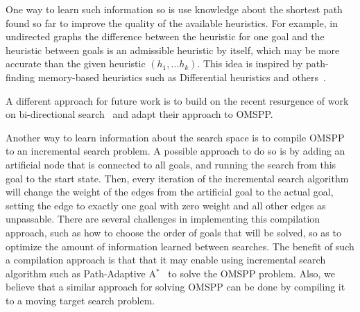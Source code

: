 \documentclass[smallextended]{svjour3}       %
\newcommand{\omspp}{\ac{OMSPP}\xspace}
\newcommand{\astar}{A$^*$\xspace}
\newcommand{\roni}[1]{\textbf{[RS:#1]}}
\begin{document}
One way to learn such information so is use knowledge about the shortest path found so far to improve the quality of the available heuristics.
For example, in undirected graphs the difference between the heuristic for one goal and the heuristic between goals is an admissible heuristic by itself, which may be more accurate than the given heuristic $(h_1, \ldots h_k)$.
This idea is inspired by path-finding memory-based heuristics such as Differential heuristics and others~\cite{sturtevant2007memory,SturtevantFBSN2009,goldenberg2011theCompressed}.


A different approach for future work is to build on the recent resurgence of work on bi-directional search~\cite{MMAAAI16,sturtevant2018aBrief,shaham2018minimizing} and adapt their approach to \omspp. 

Another way to learn information about the search space is to compile \omspp to an incremental search problem.
A possible approach to do so is by adding an artificial node that is connected to all goals, and running the search from this goal to the start state.
Then, every iteration of the incremental search algorithm will change the weight of the edges from the artificial goal to the actual goal, setting the edge to exactly one goal with zero weight and all other edges as unpassable.
There are several challenges in implementing this compilation approach, such as how to choose the order of goals that will be solved, so as to optimize the amount of information learned between searches.
The benefit of such a compilation approach is that that it may enable using incremental search algorithm such as Path-Adaptive \astar~\cite{hernandez2015reusing} to solve the \omspp problem.
Also, we believe that a similar approach for solving \omspp can be done by compiling it to a moving target search problem.




\end{document}
